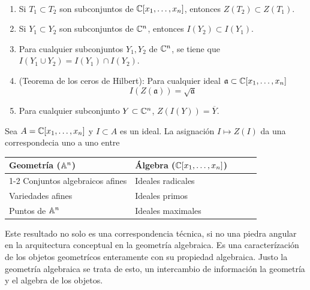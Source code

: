     \begin{propo}$ $
        \begin{enumerate}
            \item Si $T_1\subset T_2$ son subconjuntos de $\mathbb{C}[x_1,\dots,x_n]$, entonces $Z(T_2)\subset Z(T_1)$.
            \item Si $Y_1\subset Y_2$ son subconjuntos de $\mathbb{C}^n$, entonces $I(Y_2)\subset I(Y_1)$.
            \item Para cualquier subconjuntos  $Y_1, Y_2$ de $\mathbb{C}^n$, se tiene que $I(Y_1\cup Y_2)=I(Y_1)\cap I(Y_2)$.
            \item (Teorema de los ceros de Hilbert): Para cualquier ideal $\mathfrak{a}\subset \mathbb{C}[x_1,\dots,x_n]$
            \begin{equation*}
                I(Z(\mathfrak{a}))=\sqrt{\mathfrak{a}}
            \end{equation*}
            \item Para cualquier subconjunto $Y\subset \mathbb{C}^n$, $Z(I(Y))=\overline{Y}$.
        \end{enumerate}
    \end{propo}

    \begin{corollary}\label{ceroshilbert}
        Sea $A=\mathbb{C}[x_1,\dots,x_n]$ y $I\subset A$ es un ideal. La asignación $I\mapsto Z(I)$ da una correspondecia uno a uno entre 
        \begin{table}[h]
        \centering
            \begin{tabular}{l|llll}
             Geometría ($\mathbb{A}^n$) & Álgebra ($\mathbb{C}[x_1,\dots,x_n]$)  \\ \cline{1-2}
             Conjuntos algebraicos afines &Ideales radicales\\
             Variedades afines&Ideales primos\\
             Puntos de $\mathbb{A}^n$&Ideales maximales\\
            \end{tabular}
            \end{table}   
    \end{corollary}

    Este resultado no solo es una correspondencia técnica, si no una piedra angular en la arquitectura conceptual en la geometría algebraica. Es una caracterízación de los objetos geometrícos enteramente con su propiedad algebraica. Justo la geometría algebraica se trata de esto, un intercambio de información la geometría y el algebra de los objetos. 
    

